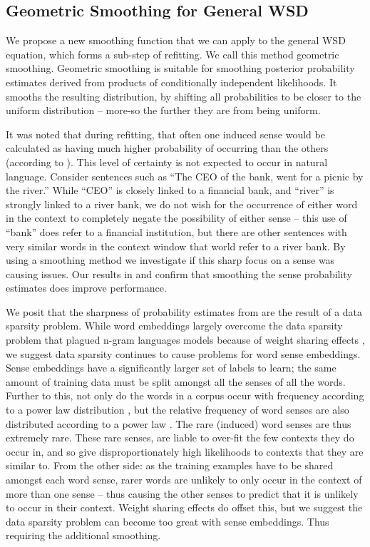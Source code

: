 \documentclass{sig-alternate}
\begin{document}
\subsection{Geometric Smoothing for General WSD} \label{smoothing}
We propose a new smoothing function that we can apply to the general WSD equation, which forms a sub-step of refitting.
We call this method geometric smoothing.
Geometric smoothing is suitable for smoothing posterior probability estimates derived from products of conditionally independent likelihoods.
It smooths the resulting distribution, by shifting all probabilities to be closer to the uniform distribution -- more-so the further they are from being uniform.

It was noted that during refitting, that often one induced sense would be calculated as having much higher probability of occurring than the others (according to ). This level of certainty is not expected to occur in natural language. Consider sentences such as \enquote{The CEO of the bank, went for a picnic by the river.} While \enquote{CEO} is closely linked to a financial bank, and \enquote{river} is strongly linked to a river bank, we do not wish for the occurrence of either word in the context to completely negate the possibility of either sense -- this use of \enquote{bank} does refer to a financial institution, but there are other sentences with very similar words in the context window that world refer to a river bank.
By using a smoothing method we investigate if this sharp focus on a sense was causing issues.
Our results in  and  confirm that smoothing the sense probability estimates does improve performance.

We posit that the sharpness of probability estimates from  are the result of a data sparsity problem. While word  embeddings largely overcome the data sparsity problem that plagued n-gram languages models because of weight sharing effects \parencite{NPLM}, we suggest data sparsity continues to cause problems for word sense embeddings. Sense embeddings have a significantly larger set of labels to learn; the same amount of training data must be split amongst all the senses of all the words. Further to this, not only do the words in a corpus occur with frequency according to a power law distribution \parencite{zipf1949human},  but the relative frequency of word senses are also distributed according to a power law \parencite{Kilgarriff2004}. The rare (induced) word senses are thus extremely rare. These rare senses, are liable to over-fit the few contexts they do occur in, and so give disproportionately high likelihoods to contexts that they are similar to. From the other side: as the training examples have to be shared amongst each word sense, rarer words are unlikely to only occur in the context of more than one sense -- thus causing the other senses to predict that it is unlikely to occur in their context. Weight sharing effects do offset this, but we suggest the data sparsity problem can become too great with sense embeddings. Thus requiring the additional smoothing.
\end{document}
